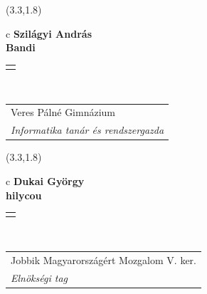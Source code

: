 \documentclass[11pt]{article}
\begin{document}
\makebox(3.3,1.8){
  \renewcommand\arraystretch{1.3}
  \begin{tabular}[c]{c}
    \hspace{8.5mm}
    \LARGE\bf{ Szilágyi András }\\
    \hspace{8.5mm}
    \Large{ Bandi }\\
    \renewcommand\arraystretch{3}
    \begin{tabular}[c]{c}
      \centering
      \fontfamily{phv}\selectfont{
        \textbf{
          \textsc{
            \scriptsize{
            \color{Dark}{ Ismerkedő }\color{Bright}{ Webmester }\color{Bright}{ Sminkmester }\color{Bright}{ Programozó }
            }
          }
        }
      }
    \end{tabular}
    \\
    \renewcommand\arraystretch{1}
    \begin{tabular}{p{3.3in}}
      \hspace{.7cm}Veres Pálné Gimnázium\\
      \hspace{.7cm}\emph{ Informatika tanár és rendszergazda }\\
    \end{tabular}
  \end{tabular}
}

\makebox(3.3,1.8){
  \renewcommand\arraystretch{1.3}
  \begin{tabular}[c]{c}
    \hspace{8.5mm}
    \LARGE\bf{ Dukai György }\\
    \hspace{8.5mm}
    \Large{ hilycou }\\
    \renewcommand\arraystretch{3}
    \begin{tabular}[c]{c}
      \centering
      \fontfamily{phv}\selectfont{
        \textbf{
          \textsc{
            \scriptsize{
            \color{Dark}{ Ismerkedő }\color{Bright}{ Webmester }\color{Bright}{ Sminkmester }\color{Bright}{ Programozó }
            }
          }
        }
      }
    \end{tabular}
    \\
    \renewcommand\arraystretch{1}
    \begin{tabular}{p{3.3in}}
      \hspace{.7cm}Jobbik Magyarországért Mozgalom V. ker.\\
      \hspace{.7cm}\emph{ Elnökségi tag }\\
    \end{tabular}
  \end{tabular}
}
\end{document}

